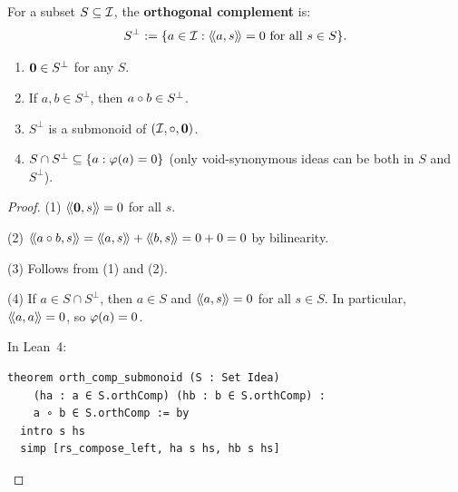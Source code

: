 \begin{definition}
\label{def:orthogonal-complement}
For a subset $S \subseteq \mathcal{I}$, the \textbf{orthogonal complement} is:
\[
  S^\perp := \{a \in \mathcal{I} : \langle\!\langle a, s \rangle\!\rangle = 0 \text{ for all } s \in S\}.
\]
\end{definition}

\begin{proposition}
\label{prop:orth-comp}
\begin{enumerate}
\item $\mathbf{0} \in S^\perp$ for any $S$.
\item If $a, b \in S^\perp$, then $a \circ b \in S^\perp$.
\item $S^\perp$ is a submonoid of $(\mathcal{I}, \circ, \mathbf{0})$.
\item $S \cap S^\perp \subseteq \{a : \varphi(a) = 0\}$ (only void-synonymous
ideas can be both in $S$ and $S^\perp$).
\end{enumerate}
\end{proposition}

\begin{proof}
(1) $\langle\!\langle \mathbf{0}, s \rangle\!\rangle = 0$ for all $s$.

(2) $\langle\!\langle a \circ b, s \rangle\!\rangle = \langle\!\langle a, s \rangle\!\rangle + \langle\!\langle b, s \rangle\!\rangle = 0 + 0 = 0$ by bilinearity.

(3) Follows from (1) and (2).

(4) If $a \in S \cap S^\perp$, then $a \in S$ and $\langle\!\langle a, s \rangle\!\rangle = 0$ for all
$s \in S$. In particular, $\langle\!\langle a, a \rangle\!\rangle = 0$, so $\varphi(a) = 0$.

In Lean~4:
\begin{lstlisting}
theorem orth_comp_submonoid (S : Set Idea)
    (ha : a ∈ S.orthComp) (hb : b ∈ S.orthComp) :
    a ∘ b ∈ S.orthComp := by
  intro s hs
  simp [rs_compose_left, ha s hs, hb s hs]
\end{lstlisting}
\end{proof}

